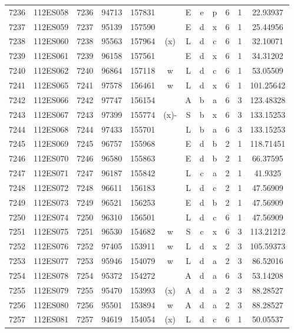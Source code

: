 \begin{tabular}{|*{12}{c|}}
7236 & 112ES058 & 7236 & 94713 & 157831 &  & E & e & p & 6 & 1 & 22.93937 \\ 
7237 & 112ES059 & 7237 & 95139 & 157590 &  & E & d & x & 6 & 1 & 25.44956 \\ 
7238 & 112ES060 & 7238 & 95563 & 157964 & (x) & L & d & c & 6 & 1 & 32.10071 \\ 
7239 & 112ES061 & 7239 & 96158 & 157561 &  & E & d & x & 6 & 1 & 34.31202 \\ 
7240 & 112ES062 & 7240 & 96864 & 157118 & w & L & d & c & 6 & 1 & 53.05509 \\ 
7241 & 112ES065 & 7241 & 97578 & 156461 & w & L & d & x & 6 & 1 & 101.25642 \\ 
7242 & 112ES066 & 7242 & 97747 & 156154 &  & A & b & a & 6 & 3 & 123.48328 \\ 
7243 & 112ES067 & 7243 & 97399 & 155774 & (x)- & S & b & x & 6 & 3 & 133.15253 \\ 
7244 & 112ES068 & 7244 & 97433 & 155701 &  & L & b & a & 6 & 3 & 133.15253 \\ 
7245 & 112ES069 & 7245 & 96757 & 155968 &  & E & d & b & 2 & 1 & 118.71451 \\ 
7246 & 112ES070 & 7246 & 96580 & 155863 &  & E & d & b & 2 & 1 & 66.37595 \\ 
7247 & 112ES071 & 7247 & 96187 & 155842 &  & L & c & a & 2 & 1 & 41.9325 \\ 
7248 & 112ES072 & 7248 & 96611 & 156183 &  & L & d & c & 2 & 1 & 47.56909 \\ 
7249 & 112ES073 & 7249 & 96521 & 156253 &  & E & d & b & 2 & 1 & 47.56909 \\ 
7250 & 112ES074 & 7250 & 96310 & 156501 &  & L & d & c & 6 & 1 & 47.56909 \\ 
7251 & 112ES075 & 7251 & 96530 & 154682 & w & S & c & x & 6 & 3 & 113.21212 \\ 
7252 & 112ES076 & 7252 & 97405 & 153911 & w & L & d & x & 2 & 3 & 105.59373 \\ 
7253 & 112ES077 & 7253 & 95946 & 154079 & w & L & d & a & 2 & 3 & 86.52016 \\ 
7254 & 112ES078 & 7254 & 95372 & 154272 &  & A & d & a & 6 & 3 & 53.14208 \\ 
7255 & 112ES079 & 7255 & 95470 & 153993 & (x) & A & d & a & 2 & 3 & 88.28527 \\ 
7256 & 112ES080 & 7256 & 95501 & 153894 & w & A & d & a & 2 & 3 & 88.28527 \\ 
7257 & 112ES081 & 7257 & 94619 & 154054 & (x) & L & d & c & 6 & 1 & 50.05537 \\ 

\end{tabular}
